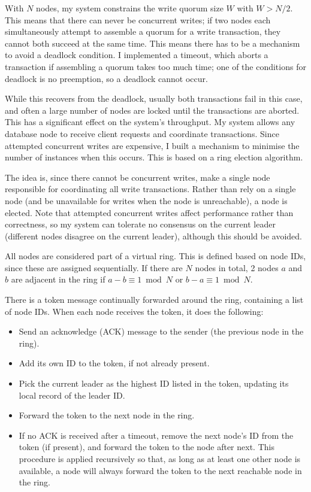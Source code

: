 \documentclass[12pt,a4paper,twoside,openany]{report}
\begin{document}
With $N$ nodes, my system constrains the write quorum size $W$ with $W > N / 2$. This means that there can never be concurrent writes; if two nodes each simultaneously attempt to assemble a quorum for a write transaction, they cannot both succeed at the same time. This means there has to be a mechanism to avoid a deadlock condition. I implemented a timeout, which aborts a transaction if assembling a quorum takes too much time; one of the conditions for deadlock is no preemption, so a deadlock cannot occur.

While this recovers from the deadlock, usually both transactions fail in this case, and often a large number of nodes are locked until the transactions are aborted. This has a significant effect on the system's throughput. My system allows any database node to receive client requests and coordinate transactions. Since attempted concurrent writes are expensive, I built a mechanism to minimise the number of instances when this occurs. This is based on a ring election algorithm.

The idea is, since there cannot be concurrent writes, make a single node responsible for coordinating all write transactions. Rather than rely on a single node (and be unavailable for writes when the node is unreachable), a node is elected. Note that attempted concurrent writes affect performance rather than correctness, so my system can tolerate no consensus on the current leader (different nodes disagree on the current leader), although this should be avoided.

All nodes are considered part of a virtual ring. This is defined based on node IDs, since these are assigned sequentially. If there are $N$ nodes in total, 2 nodes $a$ and $b$ are adjacent in the ring if $a-b \equiv 1 \bmod N$ or $b-a \equiv 1 \bmod N$.

There is a token message continually forwarded around the ring, containing a list of node IDs. When each node receives the token, it does the following:

\begin{itemize}
\item
Send an acknowledge (ACK) message to the sender (the previous node in the ring).

\item
Add its own ID to the token, if not already present.

\item
Pick the current leader as the highest ID listed in the token, updating its local record of the leader ID.

\item
Forward the token to the next node in the ring.

\item
If no ACK is received after a timeout, remove the next node's ID from the token (if present), and forward the token to the node after next. This procedure is applied recursively so that, as long as at least one other node is available, a node will always forward the token to the next reachable node in the ring.

\end{itemize}
\end{document}
